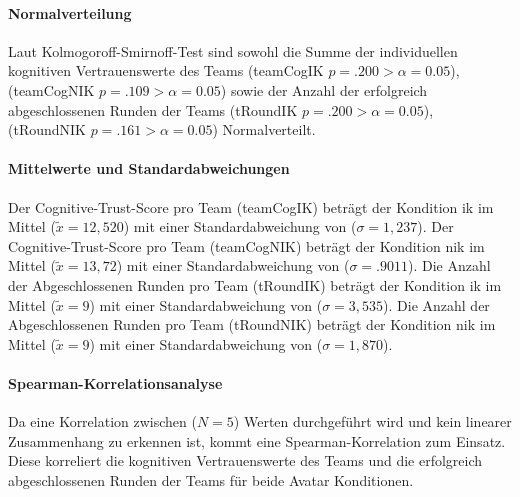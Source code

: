 \documentclass[a4paper,11pt]{article}%
\renewcommand{\\}{\vspace*{0.5\baselineskip} \newline}
\begin{document}
\paragraph{Normalverteilung}
Laut Kolmogoroff-Smirnoff-Test sind sowohl die Summe der individuellen kognitiven Vertrauenswerte des Teams (\ac{teamCogIK} $p = .200 > \alpha = 0.05$), (\ac{teamCogNIK} $p = .109 > \alpha = 0.05$) sowie der Anzahl der erfolgreich abgeschlossenen Runden der Teams (\ac{tRoundIK} $p = .200 > \alpha = 0.05$), (\ac{tRoundNIK} $p = .161 > \alpha = 0.05$) Normalverteilt.

\paragraph{Mittelwerte und Standardabweichungen}
Der Cognitive-Trust-Score pro Team (\ac{teamCogIK}) beträgt der Kondition \ac{ik} im Mittel ($\tilde x = 12,520$) mit einer Standardabweichung von ($\sigma = 1,237$).\newline 
Der Cognitive-Trust-Score pro Team (\ac{teamCogNIK}) beträgt der Kondition \ac{nik} im Mittel ($\tilde x = 13,72$) mit einer Standardabweichung von ($\sigma = .9011$). \newline 
Die Anzahl der Abgeschlossenen Runden pro Team (\ac{tRoundIK}) beträgt der Kondition \ac{ik} im Mittel ($\tilde x = 9$) mit einer Standardabweichung von ($\sigma = 3,535$).\newline 
 Die Anzahl der Abgeschlossenen Runden pro Team (\ac{tRoundNIK}) beträgt der Kondition \ac{nik} im Mittel ($\tilde x = 9$) mit einer Standardabweichung von ($\sigma = 1,870$). 

\paragraph{Spearman-Korrelationsanalyse}
Da eine Korrelation zwischen ($N=5$) Werten durchgeführt wird und kein linearer Zusammenhang zu erkennen ist, kommt eine Spearman-Korrelation zum Einsatz. Diese korreliert die kognitiven Vertrauenswerte des Teams und die erfolgreich abgeschlossenen Runden der Teams für beide Avatar Konditionen.

\end{document}
